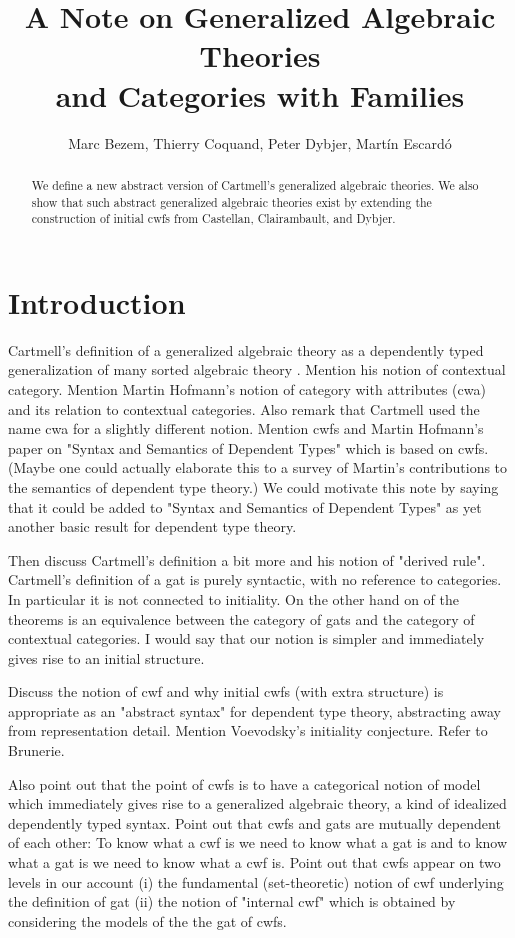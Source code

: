 \documentclass{lmcs}
\title{A Note on Generalized Algebraic Theories\\and Categories with Families}
\author{Marc Bezem, Thierry Coquand, Peter Dybjer, Mart\'in Escard\'o}
\begin{document}
\maketitle

\begin{abstract}
We define a new abstract version of Cartmell's generalized algebraic theories. We also show that such abstract generalized algebraic theories exist by extending the construction of initial cwfs from Castellan, Clairambault, and Dybjer.
\end{abstract}

\section{Introduction}

Cartmell's definition of a generalized algebraic theory as a dependently typed generalization of many sorted algebraic theory \cite{cartmell:phd,cartmell:}. Mention his notion of contextual category. Mention Martin Hofmann's notion of category with attributes (cwa) and its relation to contextual categories. Also remark that Cartmell used the name cwa for a slightly different notion. Mention cwfs and Martin Hofmann's paper on "Syntax and Semantics of Dependent Types" which is based on cwfs. (Maybe one could actually elaborate this to a survey of Martin's contributions to the semantics of dependent type theory.) We could motivate this note by saying that it could be added to "Syntax and Semantics of Dependent Types" as yet another basic result for dependent type theory.

Then discuss Cartmell's definition a bit more and his notion of "derived rule". Cartmell's definition of a gat is purely syntactic, with no reference to categories. In particular it is not connected to initiality. On the other hand on of the theorems is an equivalence between the category of gats and the category of contextual categories. I would say that our notion is simpler and immediately gives rise to an initial structure.

Discuss the notion of cwf and why initial cwfs (with extra structure) is appropriate as an "abstract syntax" for dependent type theory, abstracting away from representation detail. Mention Voevodsky's initiality conjecture. Refer to Brunerie.

Also point out that the point of cwfs is to have a categorical notion of model which immediately gives rise to a generalized algebraic theory, a kind of idealized dependently typed syntax. Point out that cwfs and gats are mutually dependent of each other: To know what a cwf is we need to know what a gat is and to know what a gat is we need to know what a cwf is. Point out that cwfs appear on two levels in our account (i) the fundamental (set-theoretic) notion of cwf underlying the definition of gat (ii) the notion of "internal cwf" which is obtained by considering the models of the the gat of cwfs.
\end{document}
